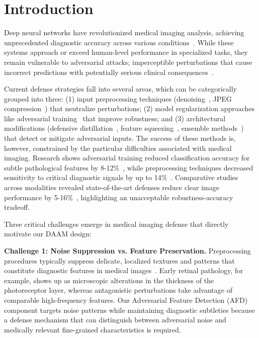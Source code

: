 \documentclass[preprint,12pt]{elsarticle}
\begin{document}


\section{Introduction}
\label{sec:introduction}

Deep neural networks have revolutionized medical imaging analysis, achieving unprecedented diagnostic accuracy across various conditions~\cite{Mamo24}. While these systems approach or exceed human-level performance in specialized tasks, they remain vulnerable to adversarial attacks; imperceptible perturbations that cause incorrect predictions with potentially serious clinical consequences~\cite{Bortsova21, Kaviani22}.

Current defense strategies fall into several areas, which can be categorically grouped into three: (1) input preprocessing techniques (denoising~\cite{Chiang20}, JPEG compression~\cite{Cheng21}) that neutralize perturbations; (2) model regularization approaches like adversarial training~\cite{Muoka23} that improve robustness; and (3) architectural modifications (defensive distillation~\cite{Qi24}, feature squeezing~\cite{vasan2024}, ensemble methods~\cite{Alzubaidi24}) that detect or mitigate adversarial inputs. The success of these methods is, however, constrained by the particular difficulties associated with medical imaging. Research shows adversarial training reduced classification accuracy for subtle pathological features by 8-12\%~\cite{Sriramanan21}, while preprocessing techniques decreased sensitivity to critical diagnostic signals by up to 14\%~\cite{Suganyadevi22}. Comparative studies across modalities revealed state-of-the-art defenses reduce clear image performance by 5-16\%~\cite{Rodriguez22}, highlighting an unacceptable robustness-accuracy tradeoff.

Three critical challenges emerge in medical imaging defense that directly motivate our DAAM design: 

\textbf{Challenge 1: Noise Suppression vs. Feature Preservation.} Preprocessing procedures typically suppress delicate, localized textures and patterns that constitute diagnostic features in medical images~\cite{Chiang20}. Early retinal pathology, for example, shows up as microscopic alterations in the thickness of the photoreceptor layer, whereas antagonistic perturbations take advantage of comparable high-frequency features. Our Adversarial Feature Detection (AFD) component targets noise patterns while maintaining diagnostic subtleties because a defense mechanism that can distinguish between adversarial noise and medically relevant fine-grained characteristics is required.
\end{document}
